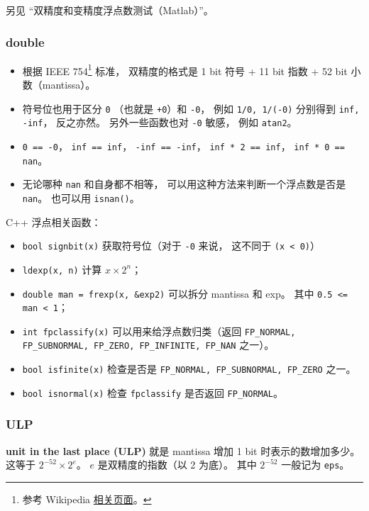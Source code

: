 
\begin{issues}
\issueDraft
\end{issues}

另见 “双精度和变精度浮点数测试（Matlab）”。

\subsubsection{double}
\begin{itemize}
\item 根据 IEEE 754\footnote{参考 Wikipedia \href{https://en.wikipedia.org/wiki/IEEE_754}{相关页面}。} 标准， 双精度的格式是 1 bit 符号 + 11 bit 指数 + 52 bit 小数（mantissa）。
\item 符号位也用于区分 \verb|0| （也就是 \verb|+0|）和 \verb|-0|， 例如 \verb|1/0, 1/(-0)| 分别得到 \verb|inf, -inf|， 反之亦然。 另外一些函数也对 \verb|-0| 敏感， 例如 \verb|atan2|。
\item \verb|0 == -0|， \verb|inf == inf|， \verb|-inf == -inf|， \verb|inf * 2 == inf|， \verb|inf * 0 == nan|。
\item 无论哪种 \verb|nan| 和自身都不相等， 可以用这种方法来判断一个浮点数是否是 \verb|nan|。 也可以用 \verb|isnan()|。
\end{itemize}

C++ 浮点相关函数：
\begin{itemize}
\item \verb|bool signbit(x)| 获取符号位（对于 \verb|-0| 来说， 这不同于 \verb|(x < 0)|）
\item \verb|ldexp(x, n)| 计算 $x \times 2^n$； 
\item \verb|double man = frexp(x, &exp2)| 可以拆分 mantissa 和 exp。 其中 \verb|0.5 <= man < 1|； 
\item \verb|int fpclassify(x)| 可以用来给浮点数归类（返回 \verb|FP_NORMAL, FP_SUBNORMAL, FP_ZERO, FP_INFINITE, FP_NAN| 之一）。 
\item \verb|bool isfinite(x)| 检查是否是 \verb|FP_NORMAL, FP_SUBNORMAL, FP_ZERO| 之一。
\item \verb|bool isnormal(x)| 检查 \verb|fpclassify| 是否返回 \verb|FP_NORMAL|。 
\end{itemize}


\subsubsection{ULP}
\textbf{unit in the last place (ULP)} 就是 mantissa 增加 1 bit 时表示的数增加多少。 这等于 $2^{-52}\times 2^{e}$。 $e$ 是双精度的指数（以 2 为底）。 其中 $2^{-52}$ 一般记为 \verb|eps|。

